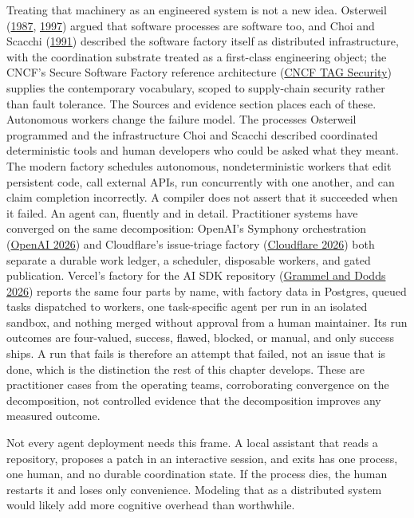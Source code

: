 Treating that machinery as an engineered system is not a new idea. Osterweil (\href{https://dl.acm.org/doi/10.5555/41765.41766}{1987}, \href{https://dl.acm.org/doi/10.1145/253228.253440}{1997}) argued that software processes are software too, and Choi and Scacchi (\href{https://www.ics.uci.edu/~wscacchi/Software-Process/Readings/DistSysFactory.pdf}{1991}) described the software factory itself as distributed infrastructure, with the coordination substrate treated as a first-class engineering object; the CNCF's Secure Software Factory reference architecture (\href{https://tag-security.cncf.io/community/working-groups/supply-chain-security/secure-software-factory/secure-software-factory/}{CNCF TAG Security}) supplies the contemporary vocabulary, scoped to supply-chain security rather than fault tolerance. The Sources and evidence section places each of these. Autonomous workers change the failure model. The processes Osterweil programmed and the infrastructure Choi and Scacchi described coordinated deterministic tools and human developers who could be asked what they meant. The modern factory schedules autonomous, nondeterministic workers that edit persistent code, call external APIs, run concurrently with one another, and can claim completion incorrectly. A compiler does not assert that it succeeded when it failed. An agent can, fluently and in detail. Practitioner systems have converged on the same decomposition: OpenAI's Symphony orchestration (\href{https://openai.com/index/open-source-codex-orchestration-symphony/}{OpenAI 2026}) and Cloudflare's issue-triage factory (\href{https://blog.cloudflare.com/astro-issue-triage/}{Cloudflare 2026}) both separate a durable work ledger, a scheduler, disposable workers, and gated publication. Vercel's factory for the AI SDK repository (\href{https://vercel.com/blog/building-a-software-factory-for-ai-sdk}{Grammel and Dodds 2026}) reports the same four parts by name, with factory data in Postgres, queued tasks dispatched to workers, one task-specific agent per run in an isolated sandbox, and nothing merged without approval from a human maintainer. Its run outcomes are four-valued, success, flawed, blocked, or manual, and only success ships. A run that fails is therefore an attempt that failed, not an issue that is done, which is the distinction the rest of this chapter develops. These are practitioner cases from the operating teams, corroborating convergence on the decomposition, not controlled evidence that the decomposition improves any measured outcome.

Not every agent deployment needs this frame. A local assistant that reads a repository, proposes a patch in an interactive session, and exits has one process, one human, and no durable coordination state. If the process dies, the human restarts it and loses only convenience. Modeling that as a distributed system would likely add more cognitive overhead than worthwhile.

